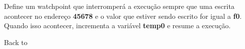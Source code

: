 \documentclass[letterpaper,10pt,brazil]{sphinxmanual}
\begin{document}
\begin{DUlineblock}{0em}
\begin{DUlineblock}{\DUlineblockindent}
\item[] 
\item[] 
\end{DUlineblock}
\item[] Define um watchpoint que interromperá a execução sempre que uma escrita acontecer no endereço \textbf{45678} e o valor que estiver sendo escrito for igual a \textbf{f0}. Quando isso acontecer, incrementa a variável \textbf{temp0} e resume a execução.
\item[] 
\item[] Back to {\hyperref[debugger/watchpoint:debugger\string-watchpoints\string-list]{}}
\end{DUlineblock}
\begin{quote}
\label{debugger/watchpoint:debugger-command-wpclear}\end{quote}
\end{document}

